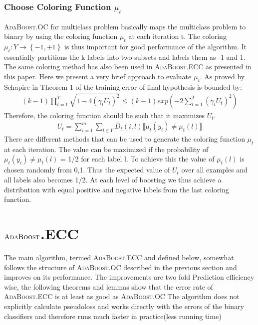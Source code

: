 \documentclass[11pt]{article}
\begin{document}
\subsubsection{Choose Coloring Function $\mu_t$}
\textsc{AdaBoost}.OC for multiclass problem basically maps the multiclass problem to binary by using the coloring function $\mu_t$ at each iteration t.  The coloring $\mu_t: Y \to \left\{-1,+1\right\}$ is thus important for good performance of the algorithm. It essentially partitions the k labels into two subsets and labels them as -1 and 1. The same coloring method has also been used in \textsc{AdaBoost}.ECC as presented in this paper. Here we present a very brief approach to evaluate $\mu_t$. As proved by Schapire in Theorem 1 of \cite{s-ocbmlp-97} the training error of final hypothesis is bounded by:
\begin{align*}
    (k-1) \prod_{t=1}^T \sqrt{1-4(\gamma_t U_t)^2} \leq (k-1)exp\left(-2 \sum_{t=1}^T (\gamma_t U_t)^2\right)
\end{align*}
Therefore, the coloring function should be such that it maximizes $U_t$.
\begin{align*}
    U_t = \sum_{i=1}^m \sum_{l \in Y} \bar D_t(i,l) \llbracket \mu_t(y_i) \neq \mu_t(l)\rrbracket
\end{align*}
There are different methods that can be used to generate the coloring function $\mu_t$ at each iteration. The value can be maximized if the probability of $\mu_t(y_i) \neq \mu_t(l)$ = 1/2 for each label l. To achieve this the value of $\mu_t(l)$ is chosen randomly from {0,1}. Thus the expected value of $U_t$ over all examples and all labels also becomes 1/2. At each level of boosting we thus achieve a distribution with equal positive and negative labels from the last coloring function.

\section{$\textsc{AdaBoost}$.ECC}
The main algorithm, termed \textsc{AdaBoost}.ECC and defined below, somewhat follows the structure of \textsc{AdaBoost}.OC described in the previous section and improves on its performance. The improvements are two fold
Prediction efficiency wise, the following theorems and lemmas show that the error rate of \textsc{AdaBoost}.ECC is at least as good as \textsc{AdaBoost}.OC
The algorithm does not explicitly calculate pseudoloss and works directly with the errors of the binary classifiers and therefore runs much faster in practice(less running time)
\end{document}
